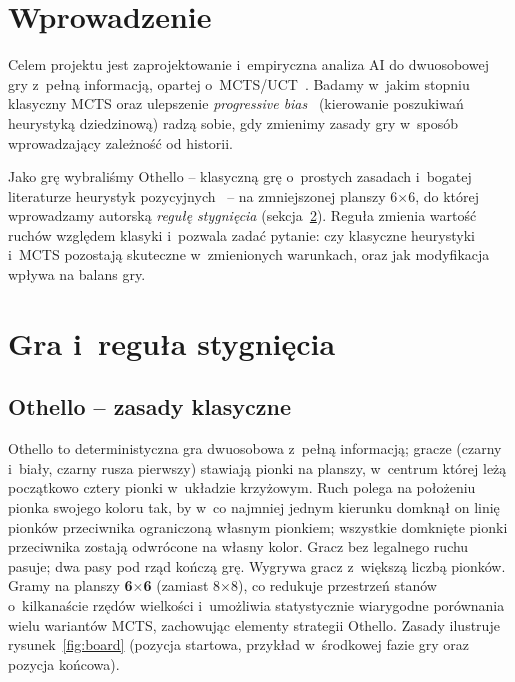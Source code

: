 \documentclass[12pt,a4paper]{article}
\begin{document}
\section{Wprowadzenie}
Celem projektu jest zaprojektowanie i~empiryczna analiza AI do dwuosobowej gry z~pełną informacją,
opartej o~MCTS/UCT~\cite{coulom2007efficient,browne2012survey,kocsis2006bandit}. Badamy w~jakim
stopniu klasyczny MCTS oraz ulepszenie \emph{progressive bias}~\cite{chaslot2008progressive}
(kierowanie poszukiwań heurystyką dziedzinową) radzą sobie, gdy zmienimy zasady gry w~sposób
wprowadzający zależność od historii.

Jako grę wybraliśmy Othello -- klasyczną grę o~prostych zasadach i~bogatej literaturze heurystyk
pozycyjnych~\cite{buro1997evaluation,buro2003evolution} -- na zmniejszonej planszy 6$\times$6, do
której wprowadzamy autorską \emph{regułę stygnięcia} (sekcja~\ref{sec:gra}). Reguła zmienia
wartość ruchów względem klasyki i~pozwala zadać pytanie: czy klasyczne heurystyki i~MCTS pozostają
skuteczne w~zmienionych warunkach, oraz jak modyfikacja wpływa na balans gry.

\section{Gra i~reguła stygnięcia}\label{sec:gra}

\subsection{Othello -- zasady klasyczne}
Othello to deterministyczna gra dwuosobowa z~pełną informacją; gracze (czarny i~biały, czarny
rusza pierwszy) stawiają pionki na planszy, w~centrum której leżą początkowo cztery pionki
w~układzie krzyżowym. Ruch polega na położeniu pionka swojego koloru tak, by w~co najmniej jednym
kierunku domknął on linię pionków przeciwnika ograniczoną własnym pionkiem; wszystkie domknięte
pionki przeciwnika zostają odwrócone na własny kolor. Gracz bez legalnego ruchu pasuje; dwa pasy
pod rząd kończą grę. Wygrywa gracz z~większą liczbą pionków. Gramy na planszy \textbf{6$\times$6}
(zamiast 8$\times$8), co redukuje przestrzeń stanów o~kilkanaście rzędów wielkości i~umożliwia
statystycznie wiarygodne porównania wielu wariantów MCTS, zachowując elementy strategii Othello.
Zasady ilustruje rysunek~\ref{fig:board} (pozycja startowa, przykład w~środkowej fazie gry oraz
pozycja końcowa).
\end{document}
